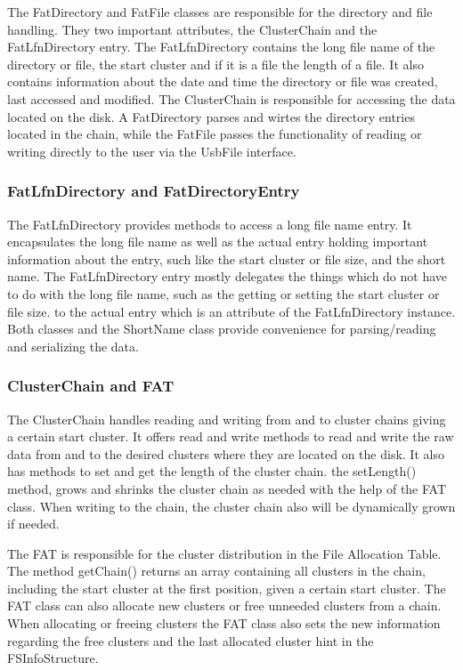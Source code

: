 The FatDirectory and FatFile classes are responsible for the directory and file handling. They two important attributes, the ClusterChain and the FatLfnDirectory entry. The FatLfnDirectory contains the long file name of the directory or file, the start cluster and if it is a file the length of a file. It also contains information about the date and time the directory or file was created, last accessed and modified. 
The ClusterChain is responsible for accessing the data located on the disk. A FatDirectory parses and wirtes the directory entries located in the chain, while the FatFile passes the functionality of reading or writing directly to the user via the UsbFile interface.

\subsubsection{FatLfnDirectory and FatDirectoryEntry}

The FatLfnDirectory provides methods to access a long file name entry. It encapsulates the long file name as well as the actual entry holding important information about the entry, such like the start cluster or file size, and the short name. The FatLfnDirectory entry mostly delegates the things which do not have to do with the long file name, such as the getting or setting the start cluster or file size. to the actual entry which is an attribute of the FatLfnDirectory instance. Both classes and the ShortName class provide convenience for parsing/reading and serializing the data. 

\subsubsection{ClusterChain and FAT}

The ClusterChain handles reading and writing from and to cluster chains giving a certain start cluster. It offers read and write methods to read and write the raw data from and to the desired clusters where they are located on the disk. It also has methods to set and get the length of the cluster chain. the setLength() method, grows and shrinks the cluster chain as needed with the help of the FAT class. When writing to the chain, the cluster chain also will be dynamically grown if needed.

The FAT is responsible for the cluster distribution in the File Allocation Table. The method getChain() returns an array containing all clusters in the chain, including the start cluster at the first position, given a certain start cluster. The FAT class can also allocate new clusters or free unneeded clusters from a chain. When allocating or freeing clusters the FAT class also sets the new information regarding the free clusters and the last allocated cluster hint in the FSInfoStructure.

